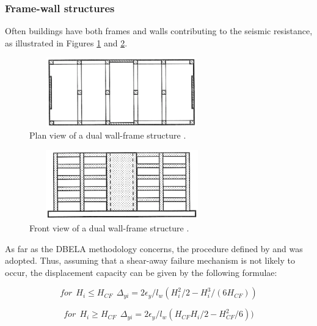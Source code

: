 \subsubsection{Frame-wall structures}

Often buildings have both frames and walls contributing to the seismic resistance, as illustrated in Figures  \ref{fig:Dual_frame_wall_plan} and  \ref{fig:Dual_frame_wall_front}.

\begin{figure}[ht]
\centering
\includegraphics[width=8cm,height=3cm]{./Figures/Part_Risk/Dual_frame_wall_plan.eps}
\caption{Plan view of a dual wall-frame structure \citep{Priestleyetal2007}.}
\label{fig:Dual_frame_wall_plan}
\end{figure}

\begin{figure}[ht]
\centering
\includegraphics[width=8cm,height=3cm]{./Figures/Part_Risk/Dual_frame_wall_front.eps}
\caption{Front view of a dual wall-frame structure \citep{Priestleyetal2007}.}
\label{fig:Dual_frame_wall_front}
\end{figure}

As far as the DBELA methodology concerns, the procedure defined by \citet{Sullivanetal2006} and \citet{Priestleyetal2007} was adopted. Thus, assuming that a shear-away failure mechanism is not likely to occur, the displacement capacity can be given by the following formulae:

\begin{equation}
for \ \ H_i\leq H_{CF} \ \ \Delta_{yi}=2\epsilon_y/l_w(H_i^2/2-H_i^3/(6H_{CF}))
\end{equation}

\begin{equation}
for \ \ H_i\ge H_{CF} \ \ \Delta_{yi}=2\epsilon_y/l_w(H_{CF}H_i/2-H_{CF}^2/6))
\end{equation}

